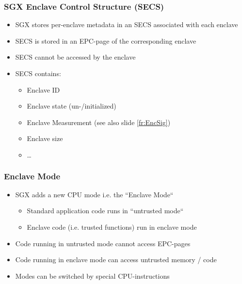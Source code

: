 \begin{frame}
    \frametitle{SGX Enclave Control Structure (SECS)}
    \begin{itemize}[<+->]
        \item SGX stores per-enclave metadata in an SECS associated with each enclave
        \item SECS is stored in an EPC-page of the corresponding enclave
        \item SECS cannot be accessed by the enclave
        \item SECS contains:
        \begin{itemize}
            \item Enclave ID
            \item Enclave state (un-/initialized)
            \item Enclave Measurement (see also slide \ref{fr:EncSig})
            \item Enclave size
            \item \dots
        \end{itemize}
    \end{itemize}
\end{frame}

\begin{frame}
    \frametitle{Enclave Mode}
    \begin{itemize}[<+->]
        \item SGX adds a new CPU mode i.e. the ``Enclave Mode``
        \begin{itemize}
            \item Standard application code runs in ``untrusted mode``
            \item Enclave code (i.e. trusted functions) run in enclave mode
        \end{itemize}
        \item Code running in untrusted mode cannot access EPC-pages
        \item Code running in enclave mode can access untrusted memory / code
        \item Modes can be switched by special CPU-instructions
    \end{itemize}
    $ $ \newline
    \centering
\end{frame}

